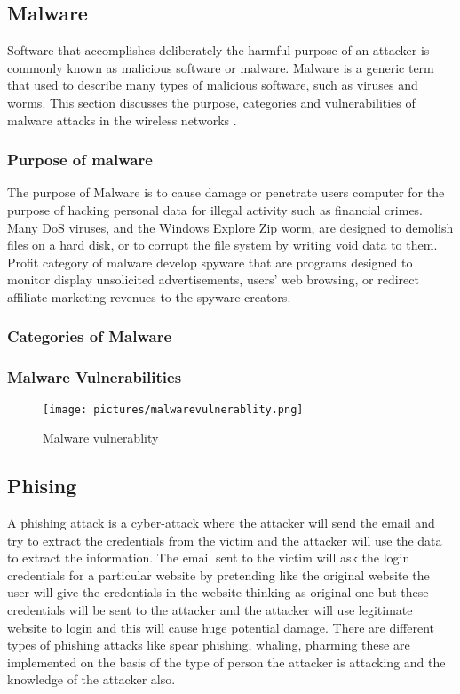 \documentclass[twocolumn]{article}
\begin{document}
\subsection{Malware}
Software that accomplishes deliberately the harmful purpose of an attacker is commonly known as malicious software or malware. Malware is a generic term that
used to describe many types of malicious software, such as viruses and worms.
This section discusses the purpose, categories and vulnerabilities of malware attacks in the wireless networks \cite{divya2013survey}.
\subsubsection{Purpose of malware}
The purpose of Malware is to cause damage or penetrate users computer for the purpose of hacking personal data for illegal activity such as financial crimes. Many DoS viruses, and the
Windows Explore Zip worm, are designed to demolish files on a hard disk, or to corrupt the file system by writing void data to them. Profit category of malware develop spyware that are programs designed to monitor display unsolicited advertisements, users' web browsing, or
redirect affiliate marketing revenues to the spyware creators.
\subsubsection{Categories of Malware}

\textcolor{red}{\lipsum[1]}

\subsubsection{Malware Vulnerabilities}

\begin{figure}[H]
\centering
\texttt{[image: pictures/malwarevulnerablity.png]}
\caption{Malware vulnerablity}
\end{figure}
\subsection{Phising}
A phishing attack is a cyber-attack where the attacker will send the email and try to extract the credentials from the victim and the attacker
will use the data to extract the information. The email sent to the victim will ask the login credentials for a particular website by pretending like the
original website the user will give the credentials in the website thinking as original one but these credentials will be sent to the attacker and the attacker
will use legitimate website to login and this will cause huge potential damage. There are different types of phishing attacks like spear phishing, whaling,
pharming these are implemented on the basis of the type of person the attacker is attacking and the knowledge of the attacker also.\cite{kanakam2022bruteforce}
\end{document}
